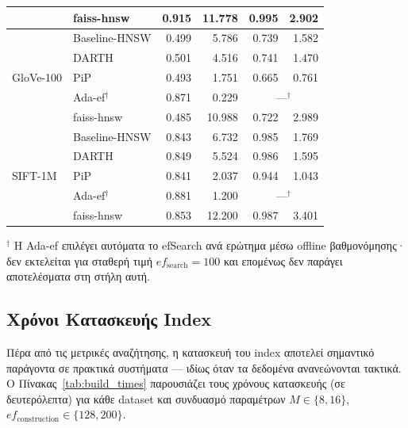 \documentclass[12pt,a4paper]{article}
\begin{document}
\begin{table}[H]
{\begin{tabular}{llrrrr}
  & faiss-hnsw    & 0.915 & 11.778 & 0.995 & 2.902 \\
\midrule
\multirow{5}{*}{GloVe-100}
  & Baseline-HNSW & 0.499 & 5.786  & 0.739 & 1.582 \\
  & DARTH         & 0.501 & 4.516  & 0.741 & 1.470 \\
  & PiP           & 0.493 & 1.751  & 0.665 & 0.761 \\
  & Ada-ef$^\dag$ & 0.871 & 0.229  & \multicolumn{2}{c}{---$^\dag$} \\
  & faiss-hnsw    & 0.485 & 10.988 & 0.722 & 2.989 \\
\midrule
\multirow{5}{*}{SIFT-1M}
  & Baseline-HNSW & 0.843 & 6.732  & 0.985 & 1.769 \\
  & DARTH         & 0.849 & 5.524  & 0.986 & 1.595 \\
  & PiP           & 0.841 & 2.037  & 0.944 & 1.043 \\
  & Ada-ef$^\dag$ & 0.881 & 1.200  & \multicolumn{2}{c}{---$^\dag$} \\
  & faiss-hnsw    & 0.853 & 12.200 & 0.987 & 3.401 \\
\bottomrule
\end{tabular}%
}
\smallskip

\noindent\footnotesize $^\dag$ Η Ada-ef επιλέγει αυτόματα το efSearch ανά ερώτημα μέσω offline βαθμονόμησης· δεν εκτελείται για σταθερή τιμή $ef_{\text{search}}=100$ και επομένως δεν παράγει αποτελέσματα στη στήλη αυτή.
\end{table}

\subsection{Χρόνοι Κατασκευής Index}

Πέρα από τις μετρικές αναζήτησης, η κατασκευή του index αποτελεί σημαντικό παράγοντα σε πρακτικά συστήματα --- ιδίως όταν τα δεδομένα ανανεώνονται τακτικά. Ο Πίνακας~\ref{tab:build_times} παρουσιάζει τους χρόνους κατασκευής (σε δευτερόλεπτα) για κάθε dataset και συνδυασμό παραμέτρων $M \in \{8,16\}$, $ef_{\text{construction}} \in \{128, 200\}$.
\end{document}
